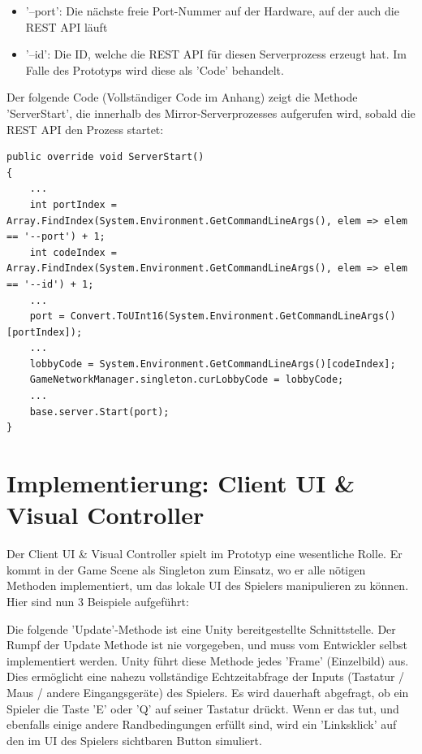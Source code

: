 \begin{itemize}
	\item '--port': Die nächste freie Port-Nummer auf der Hardware, auf der auch die REST API läuft
	\item '--id': Die ID, welche die REST API für diesen Serverprozess erzeugt hat. Im Falle des Prototyps wird diese als 'Code' behandelt.
\end{itemize}

Der folgende Code (Vollständiger Code im Anhang) zeigt die Methode 'ServerStart', die innerhalb des Mirror-Serverprozesses aufgerufen wird, sobald die REST API den Prozess startet: 

\begin{lstlisting}[caption= OwnKcpTransport.cs ServerStart()]
public override void ServerStart()
{
	...
	int portIndex = Array.FindIndex(System.Environment.GetCommandLineArgs(), elem => elem == '--port') + 1;
	int codeIndex = Array.FindIndex(System.Environment.GetCommandLineArgs(), elem => elem == '--id') + 1;
	...
	port = Convert.ToUInt16(System.Environment.GetCommandLineArgs()[portIndex]);
	...
	lobbyCode = System.Environment.GetCommandLineArgs()[codeIndex];
	GameNetworkManager.singleton.curLobbyCode = lobbyCode;
	...
	base.server.Start(port);
}
\end{lstlisting}


\section{Implementierung: Client UI \& Visual Controller}
\label{implementierung:client_UI_Controller}

Der Client UI \& Visual Controller spielt im Prototyp eine wesentliche Rolle. Er kommt in der Game Scene als Singleton \cite{M.Gatrell.2009} zum Einsatz, wo er alle nötigen Methoden implementiert, um das lokale UI des Spielers manipulieren zu können. Hier sind nun 3 Beispiele aufgeführt:

Die folgende 'Update'-Methode ist eine Unity bereitgestellte Schnittstelle. Der Rumpf der Update Methode ist nie vorgegeben, und muss vom Entwickler selbst implementiert werden. Unity führt diese Methode jedes 'Frame' (Einzelbild) \cite{Wikipedia.2021j} aus. Dies ermöglicht eine nahezu vollständige Echtzeitabfrage der Inputs (Tastatur / Maus / andere Eingangsgeräte) des Spielers. Es wird dauerhaft abgefragt, ob ein Spieler die Taste 'E' oder 'Q' auf seiner Tastatur drückt. Wenn er das tut, und ebenfalls einige andere Randbedingungen erfüllt sind, wird ein 'Linksklick' auf den im UI des Spielers sichtbaren Button simuliert.


